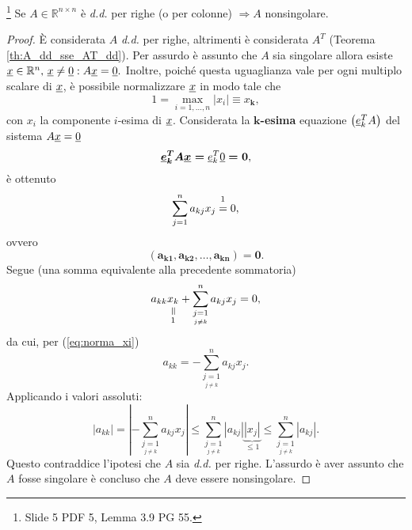 \begin{theorem}\label{th:matrice_diagonale_dominante_nonsingolare}\footnote{Slide 5 PDF 5, Lemma 3.9 PG 55.}
    Se $A\in\mathbb{R}^{n\times n}$ è \textit{d.d.} per righe (o per colonne) $\Rightarrow A$ \gls{nonsingolare}.
\end{theorem}
\begin{proof}
    È considerata $A$ \textit{d.d.} per righe, altrimenti è considerata $A^T$ (Teorema \ref{th:A_dd_sse_AT_dd}). Per assurdo è assunto che $A$ sia \gls{singolare} allora esiste $\uline x\in\mathbb R^n,\, \uline x\neq\uline 0: A\uline x=\uline 0.$ Inoltre, poiché questa uguaglianza vale per ogni multiplo scalare di $\uline x$, è possibile normalizzare $\uline x$ in modo tale che 
    \begin{equation}\label{eq:norma_xi}
       1 = \underset{i=1,\hdots,n}{\max}|x_i|\equiv x_{\boldsymbol k}, 
    \end{equation}
    con $x_i$ la componente $i$-esima di $\uline x$. Considerata la $\boldsymbol{k}$\textbf{-esima} equazione $\left( \uline e_k^T A \right)$ del sistema $A\uline x=\uline 0$
    \begin{equation*}
    	\boldsymbol{\uline e_k^T A \uline x=}\uline e_k^T\uline 0 \boldsymbol{= 0},
    \end{equation*}
    è ottenuto
    \begin{equation*}
        \sum_{j=1}^n a_{kj}x_j \overset{\footnotemark}{=} 0,
    \end{equation*}
    ovvero
    \begin{equation*}
    	\boldsymbol{(a_{k1}, a_{k2},\hdots, a_{kn})=0}.
    \end{equation*}
    Segue (una somma equivalente alla precedente sommatoria)
    \begin{equation*}
        a_{kk}\equalto{x_k}{1} +  \sum_{\underset{ j\neq k}{j=1}}^n a_{kj}x_j=0,
    \end{equation*}
    da cui, per (\ref{eq:norma_xi})
    \begin{equation*}
        a_{kk}= -\sum_{\underset{ j\neq k}{j=1}}^n a_{kj}x_j.
    \end{equation*}
    Applicando i valori assoluti:
    \begin{equation*}
        |a_{kk}|=\left|-\sum_{\underset{ j\neq k}{j=1}}^n a_{kj}x_j\right|\leq \sum_{\underset{ j\neq k}{j=1}}^n |a_{kj}|\underbrace{|x_j|}_{\leq 1}\leq \sum_{\underset{ j\neq k}{j=1}}^n |a_{kj}|.
    \end{equation*}
    Questo contraddice l'ipotesi che $A$ sia \textit{d.d.} per righe. L'assurdo è aver assunto che $A$ fosse \gls{singolare} è concluso che $A$ deve essere \gls{nonsingolare}.
\end{proof}

